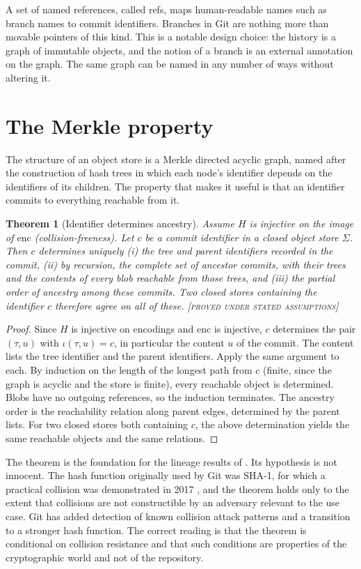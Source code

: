 \documentclass[11pt,twoside,openright]{book}
\theoremstyle{plain}
\newtheorem{theorem}{Theorem}[chapter]
\theoremstyle{definition}
\theoremstyle{remark}
\newcommand{\Proved}{\textup{\textsc{[proved under stated assumptions]}}}
\begin{document}
A set of named references, called refs, maps human-readable names such as branch names to commit identifiers. Branches in Git are nothing more than movable pointers of this kind. This is a notable design choice: the history is a graph of immutable objects, and the notion of a branch is an external annotation on the graph. The same graph can be named in any number of ways without altering it.

\section{The Merkle property}

The structure of an object store is a Merkle directed acyclic graph, named after the construction of hash trees \cite{merkle1987} in which each node's identifier depends on the identifiers of its children. The property that makes it useful is that an identifier commits to everything reachable from it.

\begin{theorem}[Identifier determines ancestry]\label{thm:merkle}
Assume $H$ is injective on the image of $\mathrm{enc}$ (collision-freeness). Let $c$ be a commit identifier in a closed object store $\Sigma$. Then $c$ determines uniquely (i) the tree and parent identifiers recorded in the commit, (ii) by recursion, the complete set of ancestor commits, with their trees and the contents of every blob reachable from those trees, and (iii) the partial order of ancestry among these commits. Two closed stores containing the identifier $c$ therefore agree on all of these.
\Proved{}
\end{theorem}

\begin{proof}
Since $H$ is injective on encodings and $\mathrm{enc}$ is injective, $c$ determines the pair $(\tau,u)$ with $\iota(\tau,u)=c$, in particular the content $u$ of the commit. The content lists the tree identifier and the parent identifiers. Apply the same argument to each. By induction on the length of the longest path from $c$ (finite, since the graph is acyclic and the store is finite), every reachable object is determined. Blobs have no outgoing references, so the induction terminates. The ancestry order is the reachability relation along parent edges, determined by the parent lists. For two closed stores both containing $c$, the above determination yields the same reachable objects and the same relations.
\end{proof}

The theorem is the foundation for the lineage results of . Its hypothesis is not innocent. The hash function originally used by Git was SHA-1, for which a practical collision was demonstrated in 2017 \cite{stevens2017}, and the theorem holds only to the extent that collisions are not constructible by an adversary relevant to the use case. Git has added detection of known collision attack patterns and a transition to a stronger hash function. The correct reading is that the theorem is conditional on collision resistance and that such conditions are properties of the cryptographic world and not of the repository.
\end{document}
